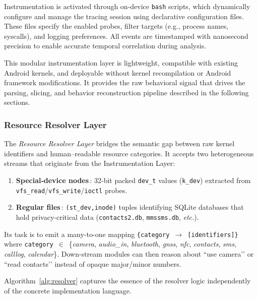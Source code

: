 \documentclass[a4paper,12pt]{report}
\begin{document}
Instrumentation is activated through on-device \texttt{bash} scripts, which dynamically configure and manage the tracing session using declarative configuration files. These files specify the enabled probes, filter targets (e.g., process names, syscalls), and logging preferences. All events are timestamped with nanosecond precision to enable accurate temporal correlation during analysis.

This modular instrumentation layer is lightweight, compatible with existing Android kernels, and deployable without kernel recompilation or Android framework modifications. It provides the raw behavioral signal that drives the parsing, slicing, and behavior reconstruction pipeline described in the following sections.


\subsubsection{Resource Resolver Layer}

The \emph{Resource Resolver Layer} bridges the semantic gap between
raw kernel identifiers and human–readable resource categories.  It
accepts two heterogeneous streams that originate from the
Instrumentation Layer:

\begin{enumerate}
  \item \textbf{Special‐device nodes}\,: 32-bit packed
        \texttt{dev\_t} values (\texttt{k\_dev}) extracted from
        \texttt{vfs\_read}/\texttt{vfs\_write}/\texttt{ioctl} probes.
  \item \textbf{Regular files}\,: \texttt{(st\_dev,\;inode)} tuples
        identifying SQLite databases that hold privacy-critical data
        (\texttt{contacts2.db}, \texttt{mmssms.db}, \textit{etc.}).
\end{enumerate}

Its task is to emit a many-to-one mapping
\texttt{\{category $\rightarrow$ [identifiers]\}} where
\texttt{category}~$\in$~\{\textit{camera}, \textit{audio\_in},
\textit{bluetooth}, \textit{gnss}, \textit{nfc},
\textit{contacts}, \textit{sms}, \textit{calllog},
\textit{calendar}\}.
Down-stream modules can then reason about ``use camera’’ or ``read
contacts’’ instead of opaque major/minor numbers.

Algorithm~\ref{alg:resolver} captures the essence of the resolver logic
independently of the concrete implementation language.
\end{document}
